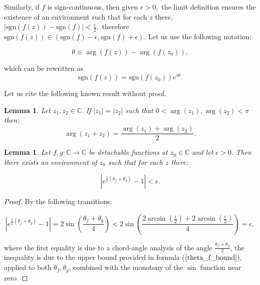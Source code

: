 \documentclass[11pt]{book}
\newtheorem{lem}[thm]{Lemma}
\begin{document}
\begin{remark}Similarly, if $f$ is sign-continuous, then given $\epsilon>0,$ the limit definition ensures the existence of an environment such that for each $z$ there, $\left|\text{sgn}\left(f\left(z\right)\right)-\text{sgn}\left(f\right)\right|<\frac{\epsilon}{2},$ therefore $\text{sgn}\left(f\left(z\right)\right)\in\left(\text{sgn}\left(f\right)-\epsilon,\text{sgn}\left(f\right)+\epsilon\right).$ Let us use the following notation:

$$\theta\equiv\arg\left(f\left(z\right)\right)-\arg\left(f\left(z_{0}\right)\right),$$

which can be rewritten as $$\text{sgn}\left(f\left(z\right)\right)=\text{sgn}\left(f\left(z_{0}\right)\right)e^{i\theta}.\label{sgn_f_formula}$$

Let us cite the following known result without proof.
\end{remark}

\begin{lem}\label{argz1_z2}Let $z_{1},z_{2}\in\mathbb{C}.$ If $\left|z_{1}\right|=\left|z_{2}\right|$ such that $0<\arg\left(z_{1}\right),\arg\left(z_{2}\right)<\pi$ then: $$\arg\left(z_{1}+z_{2}\right)=\frac{\arg\left(z_{1}\right)+\arg\left(z_{2}\right)}{2}.\label{arg_sum}$$
\end{lem}

\begin{lem}\label{theta_fg_upper_bound}Let $f,g:\mathbb{C}\longrightarrow\mathbb{C}$ be detachable functions at $z_{0}\in\mathbb{C}$ and let $\epsilon>0.$ Then there exists an environment of $z_{0}$ such that for each $z$ there:

$$\left|e^{\frac{i}{2}\left(\theta_{f}+\theta_{g}\right)}-1\right|<\epsilon.$$
\end{lem}
\begin{proof}By the following transitions:

$$\left|e^{\frac{i}{2}\left(\theta_{f}+\theta_{g}\right)}-1\right|=2\sin\left(\frac{\theta_{f}+\theta_{g}}{4}\right)<2\sin\left(\frac{2\arcsin\left(\frac{\epsilon}{2}\right)+2\arcsin\left(\frac{\epsilon}{2}\right)}{4}\right)=\epsilon,$$

where the first equality is due to a chord-angle analysis of the angle $\frac{\theta_{f}+\theta_{g}}{2}$, the inequality is due to the upper bound provided in formula ($\ref{theta_f_bound}$),
applied to both $\theta_{f},\theta_{g}$, combined with the monotony of the $\sin$ function near zero.
\end{proof}
\end{document}
